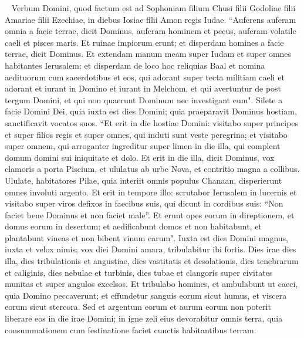 
\begin{biblechapter}   
\verse Verbum Domini, quod factum est ad Sophoniam filium Chusi filii Godoliae filii Amariae filii Ezechiae, in diebus Iosiae filii Amon regis Iudae. 
\verse “Auferens auferam omnia a facie terrae, dicit Dominus, 
\verse auferam hominem et pecus, auferam volatile caeli et pisces maris. Et ruinae impiorum erunt; et disperdam homines a facie terrae, dicit Dominus. 
\verse Et extendam manum meam super Iudam et super omnes habitantes Ierusalem; et disperdam de loco hoc reliquias Baal et nomina aedituorum cum sacerdotibus 
\verse et eos, qui adorant super tecta militiam caeli et adorant et iurant in Domino et iurant in Melchom, 
\verse et qui avertuntur de post tergum Domini, et qui non quaerunt Dominum nec investigant eum". 
\verse Silete a facie Domini Dei, quia iuxta est dies Domini; quia praeparavit Dominus hostiam, sanctificavit vocatos suos. 
\verse “Et erit in die hostiae Domini: visitabo super principes et super filios regis et super omnes, qui induti sunt veste peregrina; 
\verse et visitabo super omnem, qui arroganter ingreditur super limen in die illa, qui complent domum domini sui iniquitate et dolo. 
\verse Et erit in die illa, dicit Dominus, vox clamoris a porta Piscium, et ululatus ab urbe Nova, et contritio magna a collibus. 
\verse Ululate, habitatores Pilae, quia interiit omnis populus Chanaan, disperierunt omnes involuti argento. 
\verse Et erit in tempore illo: scrutabor Ierusalem in lucernis et visitabo super viros defixos in faecibus suis, qui dicunt in cordibus suis: “Non faciet bene Dominus et non faciet male”. 
\verse Et erunt opes eorum in direptionem, et domus eorum in desertum; et aedificabunt domos et non habitabunt, et plantabunt vineas et non bibent vinum earum". 
\verse Iuxta est dies Domini magnus, iuxta et velox nimis; vox diei Domini amara, tribulabitur ibi fortis. 
\verse Dies irae dies illa, dies tribulationis et angustiae, dies vastitatis et desolationis, dies tenebrarum et caliginis, dies nebulae et turbinis, 
\verse dies tubae et clangoris super civitates munitas et super angulos excelsos. 
\verse Et tribulabo homines, et ambulabunt ut caeci, quia Domino peccaverunt; et effundetur sanguis eorum sicut humus, et viscera eorum sicut stercora. 
\verse Sed et argentum eorum et aurum eorum non poterit liberare eos in die irae Domini; in igne zeli eius devorabitur omnis terra, quia consummationem cum festinatione faciet cunctis habitantibus terram. 
\end{biblechapter}

